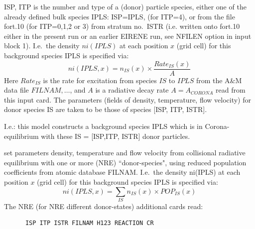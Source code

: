 \begin{description}
\begin{description}
                ISP, ITP is the number and type of a (donor) particle species, either one of
                the already defined bulk species IPLS: ISP=IPLS, (for ITP=4), or from the file
                fort.10 (for ITP=0,1,2 or 3) from stratum no.\ ISTR (i.e. written onto fort.10
                either in the present run or an earlier EIRENE run, see NFILEN option in input
                block 1).
                I.e.\ the density $ni(IPLS)$ at each position $x$ (grid cell) for this
                background species IPLS is specified via:
                \begin{equation}
                  \nonumber
                  ni(IPLS,x)= n_{IS}
                  (x) \times \frac{Rate_{IS}(x)}{A}
                \end{equation}
                Here $Rate_{IS}$ is the rate
                for excitation from species $IS$ to $IPLS$ from the A\&M data file $FILNAM,
                  \dots$, and $A$ is a radiative decay rate $A = A_{CORONA}$ read from this input
                card.
                The parameters (fields of density, temperature, flow velocity) for donor
                species IS are taken to be those of species [ISP, ITP, ISTR].

                I.e.: this model constructs a background species IPLS which is in
                Corona-equilibrium with these IS = [ISP,ITP, ISTR] donor particles.
          \item[= 'Colrad'] set parameters density, temperature and flow velocity from
                collisional radiative equilibrium with one or more (NRE) ``donor-species",
                using reduced population coefficients from atomic database FILNAM.
                I.e.\ the density ni(IPLS) at each position $x$ (grid cell) for this background
                species IPLS is specified via:
                \begin{equation}
                  \nonumber
                  ni(IPLS,x)= \sum_{IS} n_{IS}
                  (x) \times POP_{IS}(x)
                \end{equation}
                The NRE (for NRE different donor-states)
                additional cards read:

                \begin{lstlisting}
      ISP ITP ISTR FILNAM H123 REACTION CR
\end{lstlisting}


\end{description}
\end{description}
